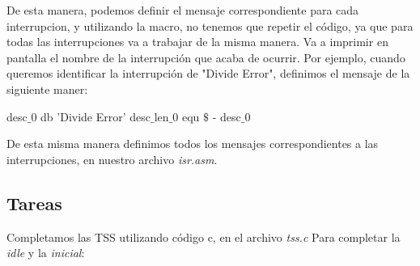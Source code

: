 De esta manera, podemos definir el mensaje correspondiente para cada interrupcion, y utilizando la macro, no tenemos que repetir el c\'odigo, ya que para todas las interrupciones va a trabajar de la misma manera. Va a imprimir en pantalla el nombre de la interrupci\'on que acaba de ocurrir.
Por ejemplo, cuando queremos identificar la interrupci\'on de "Divide Error", definimos el mensaje de la siguiente maner:

\begin{algorithmic}
\State \tab desc$\_$0 db   'Divide Error'
\State \tab desc$\_$len$\_$0 equ     $\$$ - desc$\_$0
\end{algorithmic}

De esta misma manera definimos todos los mensajes correspondientes a las interrupciones, en nuestro archivo \textit{isr.asm}.
\subsection{Tareas}

Completamos las TSS utilizando c\'odigo c, en el archivo \textit{tss.c}
Para completar la \textit{idle}  y la \textit{inicial}:

